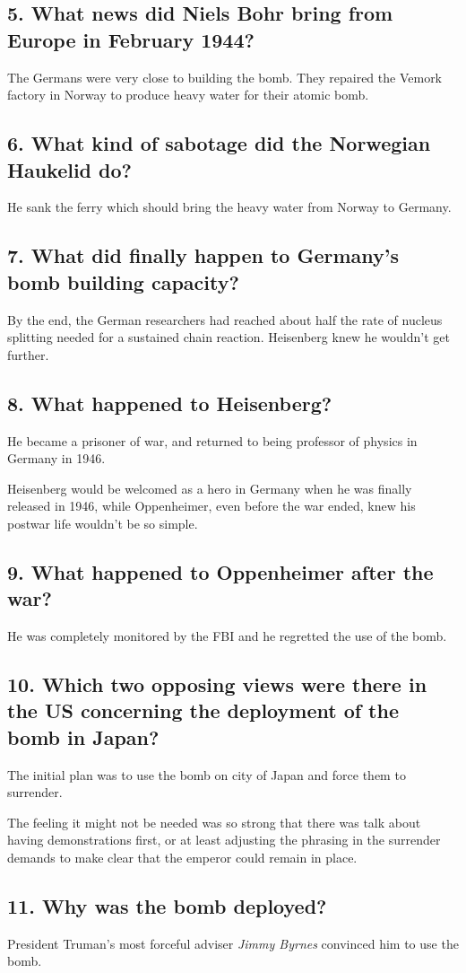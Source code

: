 \subsection*{5. What news did Niels Bohr bring from Europe in February 1944?}
The Germans were very close to building the bomb. They repaired the Vemork factory in Norway to produce heavy water for their atomic bomb.

\subsection*{6. What kind of sabotage did the Norwegian Haukelid do?}
He sank the ferry which should bring the heavy water from Norway to Germany.

\subsection*{7. What did finally happen to Germany's bomb building capacity?}
By the end, the German researchers had reached about half the rate of nucleus splitting needed for a sustained chain reaction. Heisenberg knew he wouldn't get further.

\subsection*{8. What happened to Heisenberg?}
He became a prisoner of war, and returned to being professor of physics in Germany in 1946.

Heisenberg would be welcomed as a hero in Germany when he was finally released in 1946, while Oppenheimer, even before the war ended, knew his postwar life wouldn't be so simple.

\subsection*{9. What happened to Oppenheimer after the war?}
He was completely monitored by the FBI and he regretted the use of the bomb.


\subsection*{10. Which two opposing views were there in the US concerning the deployment of the bomb in Japan?}
The initial plan was to use the bomb on city of Japan and force them to surrender.

The feeling it might not be needed was so strong that there was talk about having demonstrations first, or at least adjusting the phrasing in the surrender demands to make clear that the emperor could remain in place.

\subsection*{11. Why was the bomb deployed?}
President Truman's most forceful adviser \emph{Jimmy Byrnes} convinced him to use the bomb.
